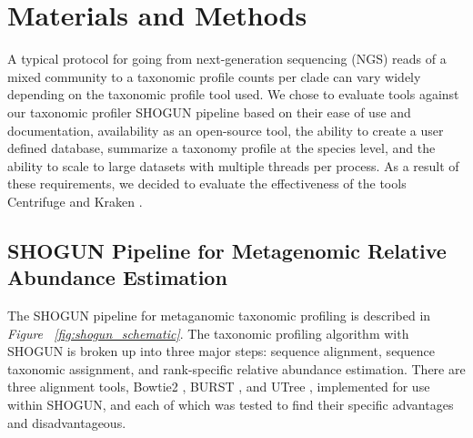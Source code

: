 
\section{Materials and Methods}

A typical protocol for going from next-generation sequencing (NGS) reads of a mixed community to a taxonomic profile counts per clade can vary widely depending on the taxonomic profile tool used. We chose to evaluate tools against our taxonomic profiler SHOGUN \cite{benjamin_hillmann_knights-lab/shogun:_2017} pipeline based on their ease of use and documentation, availability as an open-source tool, the ability to create a user defined database, summarize a taxonomy profile at the species level, and the ability to scale to large datasets with multiple threads per process. As a result of these requirements, we decided to evaluate the effectiveness of the tools Centrifuge \cite{kim_centrifuge:_2016} and Kraken \cite{wood_kraken:_2014}.

\subsection{SHOGUN Pipeline for Metagenomic Relative Abundance Estimation}

The SHOGUN pipeline for metaganomic taxonomic profiling is described in \textit{Figure ~\ref{fig:shogun_schematic}}. The taxonomic profiling algorithm with SHOGUN is broken up into three major steps: sequence alignment, sequence taxonomic assignment, and rank-specific relative abundance estimation. There are three alignment tools, Bowtie2 \cite{langmead_fast_2012}, BURST \cite{gabriel_al-ghalith_knights-lab/burst:_2017}, and UTree \cite{gabriel_al-ghalith_knights-lab/utree:_2017}, implemented for use within SHOGUN, and each of which was tested to find their specific advantages and disadvantageous.

